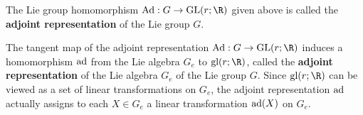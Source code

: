 \documentclass[11pt]{article}
\begin{document}
\begin{definition}
    The Lie group homomorphism $\Ad : G \rightarrow \GL(r; \R)$ given above is called the \textbf{adjoint representation} of the Lie group $G$. 
\end{definition}

The tangent map of the adjoint representation $\Ad : G \rightarrow \GL(r; \R)$ induces a homomorphism $\text{ad}$ from the Lie algebra $G_e$ to $\gl(r; \R)$, called the \textbf{adjoint representation} of the Lie algebra $G_e$ of the Lie group $G$. Since $\gl(r; \R)$ can be viewed as a set of linear transformations on $G_e$, the adjoint representation $\text{ad}$ actually assigns to each $X \in G_e$ a linear transformation $\text{ad}(X)$ on $G_e$. 

 

\end{document}
